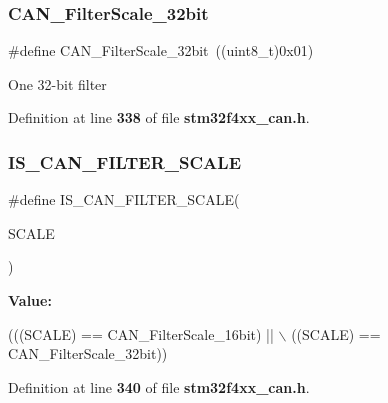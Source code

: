 \subsubsection{C\+A\+N\+\_\+\+Filter\+Scale\+\_\+32bit}
{\footnotesize\ttfamily \#define C\+A\+N\+\_\+\+Filter\+Scale\+\_\+32bit~((uint8\+\_\+t)0x01)}

One 32-\/bit filter 

Definition at line \textbf{ 338} of file \textbf{ stm32f4xx\+\_\+can.\+h}.

\mbox{\label{group__CAN__filter__scale_gaf64c93166af0eb5ec7e804116f10783a}} 
\subsubsection{I\+S\+\_\+\+C\+A\+N\+\_\+\+F\+I\+L\+T\+E\+R\+\_\+\+S\+C\+A\+LE}
{\footnotesize\ttfamily \#define I\+S\+\_\+\+C\+A\+N\+\_\+\+F\+I\+L\+T\+E\+R\+\_\+\+S\+C\+A\+LE(\begin{DoxyParamCaption}\item[{}]{S\+C\+A\+LE }\end{DoxyParamCaption})}

{\bfseries Value\+:}
\begin{DoxyCode}
(((SCALE) == CAN_FilterScale_16bit) || \(\backslash\)
                                    ((SCALE) == CAN_FilterScale_32bit))
\end{DoxyCode}


Definition at line \textbf{ 340} of file \textbf{ stm32f4xx\+\_\+can.\+h}.

